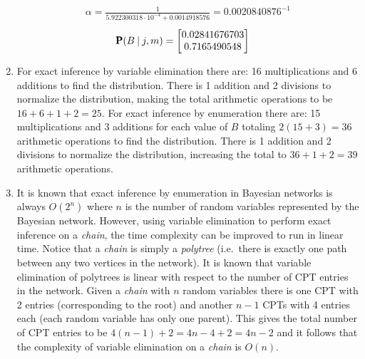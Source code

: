 \documentclass[a4paper, 12pt, one column, aas_macros]{article}
\newcommand\given[1][]{\:#1\vert\:}
\begin{document}
\begin{enumerate}[label=\alph*]
\begin{align*}
          \end{align*}
          \begin{align*}
          	\alpha = \frac{1}{5.922300318 \cdot 10^{-4} + 0.0014918576} = 0.0020840876^{-1}
             \end{align*}
          \begin{align*}
              \text{\pmb{P}}(B\given j, m) &= \begin{bmatrix}
              0.02841676703 \\ 0.7165490548
              \end{bmatrix}
          \end{align*}
  	\item
    	\begin{flushleft}
    		For exact inference by variable elimination there are: 16 multiplications and 6 additions to find the distribution. There is 1 addition and 2 divisions to normalize the distribution, making the total arithmetic operations to be $16 + 6 + 1 + 2 = 25$. \linebreak \linebreak For exact inference by enumeration there are: 15 multiplications and 3 additions for each value of $B$ totaling $2(15 + 3) = 36$ arithmetic operations to find the distribution. There is 1 addition and 2 divisions to normalize the distribution, increasing the total to $36 + 1 + 2 = 39$ arithmetic operations.
    	\end{flushleft}
  	\item
    	It is known that exact inference by enumeration in Bayesian networks is always $O(2^n)$ where $n$ is the number of random variables represented by the Bayesian network. However, using variable elimination to perform exact inference on a \textit{chain}, the time complexity can be improved to run in linear time. Notice that a \textit{chain} is simply a \textit{polytree} (i.e.\ there is exactly one path between any two vertices in the network). It is known that variable elimination of polytrees is linear with respect to the number of CPT entries in the network. Given a \textit{chain} with $n$ random variables there is one CPT with 2 entries (corresponding to the root) and another $n-1$ CPTs with 4 entries each (each random variable has only one parent). This gives the total number of CPT entries to be $4(n-1) + 2 = 4n - 4 + 2 = 4n - 2$ and it follows that the complexity of variable elimination on a \textit{chain} is $O(n)$.
  \end{enumerate}
\end{document}
